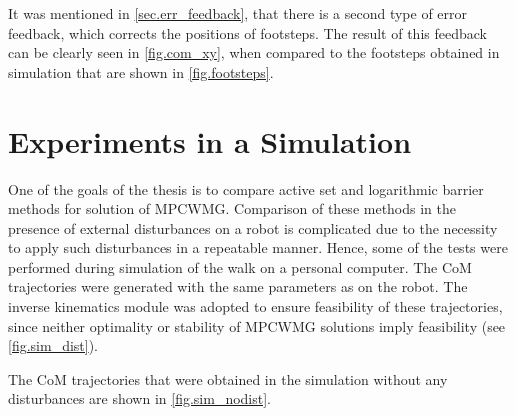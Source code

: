 It was mentioned in \cref{sec.err_feedback}, that there is a second type of 
error feedback, which corrects the positions of footsteps. The result of this
feedback can be clearly seen in \cref{fig.com_xy}, when compared to the 
footsteps obtained in simulation that are shown in \cref{fig.footsteps}.



\section{Experiments in a Simulation}
One of the goals of the thesis is to compare active set and logarithmic barrier
methods for solution of \ac{MPCWMG}. Comparison of these methods in the presence
of external disturbances on a robot is complicated due to the necessity to apply such
disturbances in a repeatable manner. Hence, some of the tests were performed
during simulation of the walk on a personal computer. The \ac{CoM} trajectories 
were generated with the same parameters as on the robot. The inverse kinematics 
module was adopted to ensure feasibility of these trajectories, since neither 
optimality or stability of \ac{MPCWMG} solutions imply feasibility (see 
\cref{fig.sim_dist}).

The \ac{CoM} trajectories that were obtained in the simulation without any 
disturbances are shown in \cref{fig.sim_nodist}.

